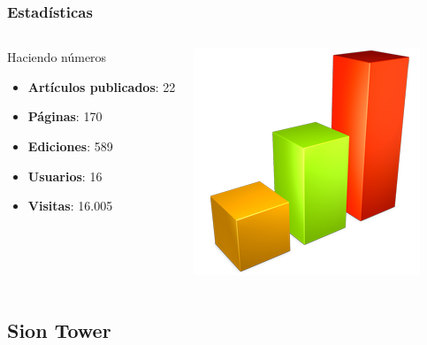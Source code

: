 \documentclass[green]{beamer}
\begin{document}
\begin{frame}
\transdissolve
    \frametitle{Estadísticas}

    \begin{columns}[t]
    \column{150pt}
        
	\begin{block}{Haciendo números}
            \begin{itemize}
		\item \textbf{Artículos publicados}: 22
                \item \textbf{Páginas}: 170
		\item \textbf{Ediciones}: 589
		\item \textbf{Usuarios}: 16
		\item \textbf{Visitas}: 16.005
            \end{itemize}            
        \end{block}

    \column{150pt}

	\begin{center}
	    \includegraphics[scale=0.25]{img/estadisticas.png}
	\end{center}

    \end{columns} 

\end{frame}

\subsection{Sion Tower}
\end{document}
